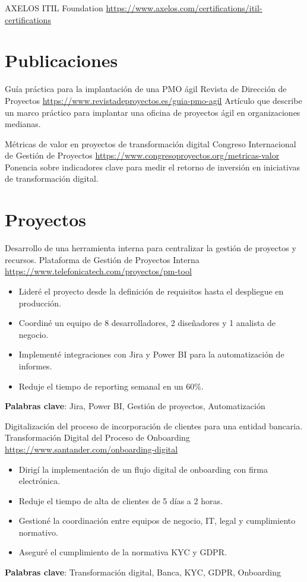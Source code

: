 \documentclass[a4paper, serif, 10pt]{moderncv}
\begin{document}
        {AXELOS}
        {ITIL Foundation}
        {\url{https://www.axelos.com/certifications/itil-certifications}}
        {}
        {}
\section{Publicaciones}

        {Guía práctica para la implantación de una PMO ágil}
        {Revista de Dirección de Proyectos}
        {\url{https://www.revistadeproyectos.es/guia-pmo-agil}}
        {}
        {Artículo que describe un marco práctico para implantar una oficina de proyectos ágil en organizaciones medianas.}

        {Métricas de valor en proyectos de transformación digital}
        {Congreso Internacional de Gestión de Proyectos}
        {\url{https://www.congresoproyectos.org/metricas-valor}}
        {}
        {Ponencia sobre indicadores clave para medir el retorno de inversión en iniciativas de transformación digital.}
\section{Proyectos}

        {Desarrollo de una herramienta interna para centralizar la gestión de proyectos y recursos.}
        {Plataforma de Gestión de Proyectos Interna}
        {\url{https://www.telefonicatech.com/proyectos/pm-tool}}
        {}
        {\begin{itemize}
\item Lideré el proyecto desde la definición de requisitos hasta el despliegue en producción.
\item Coordiné un equipo de 8 desarrolladores, 2 diseñadores y 1 analista de negocio.
\item Implementé integraciones con Jira y Power BI para la automatización de informes.
\item Reduje el tiempo de reporting semanal en un 60\%.
\end{itemize}
\textbf{Palabras clave}: Jira, Power BI, Gestión de proyectos, Automatización}

        {Digitalización del proceso de incorporación de clientes para una entidad bancaria.}
        {Transformación Digital del Proceso de Onboarding}
        {\url{https://www.santander.com/onboarding-digital}}
        {}
        {\begin{itemize}
\item Dirigí la implementación de un flujo digital de onboarding con firma electrónica.
\item Reduje el tiempo de alta de clientes de 5 días a 2 horas.
\item Gestioné la coordinación entre equipos de negocio, IT, legal y cumplimiento normativo.
\item Aseguré el cumplimiento de la normativa KYC y GDPR.
\end{itemize}
\textbf{Palabras clave}: Transformación digital, Banca, KYC, GDPR, Onboarding}
\end{document}
